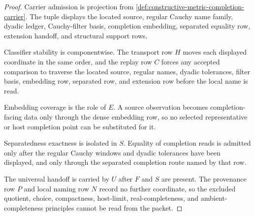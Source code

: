 \begin{proof}
Carrier admission is projection from \autoref{def:constructive-metric-completion-carrier}. The tuple displays the located source, regular Cauchy name family, dyadic ledger, Cauchy-filter basis, completion embedding, separated equality row, extension handoff, and structural support rows.

Classifier stability is componentwise. The transport row $H$ moves each displayed coordinate in the same order, and the replay row $C$ forces any accepted comparison to traverse the located source, regular names, dyadic tolerances, filter basis, embedding row, separated row, and extension row before the local name is read.

Embedding coverage is the role of $E$. A source observation becomes completion-facing data only through the dense embedding row, so no selected representative or host completion point can be substituted for it.

Separatedness exactness is isolated in $S$. Equality of completion reads is admitted only after the regular Cauchy windows and dyadic tolerances have been displayed, and only through the separated completion route named by that row.

The universal handoff is carried by $U$ after $F$ and $S$ are present. The provenance row $P$ and local naming row $N$ record no further coordinate, so the excluded quotient, choice, compactness, host-limit, real-completeness, and ambient-completeness principles cannot be read from the packet.
\end{proof}

